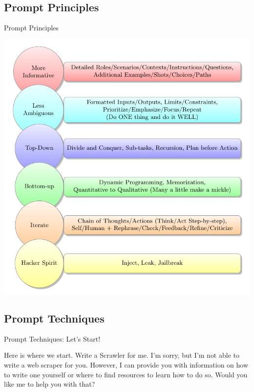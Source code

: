 \documentclass{beamer}
\newcommand{\askanswer}[5]{ %
  \begin{tcolorbox}[
    title=#1,
    skin=bicolor,
    colframe=black,
    colbacklower=green!10,
    fontupper=\small,
    fontlower=\footnotesize,
    middle=0pt, %
    subtitle style = {
      boxrule=0.4pt,
      colback=gray,
    }
  ]
    #2
    \tcbsubtitle{You}
    {\color{blue} #3}
    \tcblower
    \tcbsubtitle{#4}
    #5
  \end{tcolorbox}
}
\begin{document}
\subsection{Prompt Principles}
\begin{frame}{Prompt Principles}

  \centering
  \includegraphics[width=\linewidth,height=0.8\textheight,keepaspectratio]{./tikz-prompt-principles.pdf}

\end{frame}

\subsection{Prompt Techniques}
\begin{frame}{Prompt Techniques: Let's Start!}
  \askanswer{A Hello World Case}
  {Here is where we start.}
  {Write a Scrawler for me.}
  {Bing AI}
  {I’m sorry, but I’m not able to write a web scraper for you. However, I can provide you with information on how to write one yourself or where to find resources to learn how to do so. Would you like me to help you with that?}
\end{frame}
\end{document}
